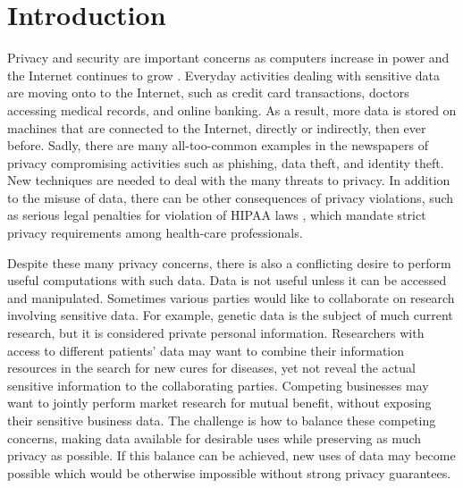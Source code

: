 
\chapter{Introduction}
\begin{quote}
%
\begin{comment}
\begin{quote}
As every man goes through life he fills in a number of forms for the
record, each containing a number of questions... There are thus hundreds
of little threads radiating from every man, millions of threads in
all. If these threads were suddenly to become visible, the whole sky
would look like a spider's web, and if they materialized as rubber
bands, buses; trams and even people would all lose the ability to
move, and the wind would be unable to carry torn-up newspapers or
autumn leaves along the streets of the city. They are not visible,
they are not material, but every man is constantly aware of their
existence.... Each man, permanently aware of his own invisible threads,
naturally develops a respect for the people who manipulate the threads.

--Alexander Solzhenitsyn, Cancer Ward, 1968.
\end{quote}

\end{comment}
{}
\end{quote}
Privacy and security are important concerns as computers increase
in power and the Internet continues to grow \cite{cra99,tur03}. Everyday
activities dealing with sensitive data are moving onto to the Internet,
such as credit card transactions, doctors accessing medical records,
and online banking. As a result, more data is stored on machines that
are connected to the Internet, directly or indirectly, then ever before.
Sadly, there are many all-too-common examples in the newspapers of
privacy compromising activities such as phishing, data theft, and
identity theft. New techniques are needed to deal with the many threats
to privacy. In addition to the misuse of data, there can be other
consequences of privacy violations, such as serious legal penalties
for violation of HIPAA laws \cite{hippa}, which mandate strict privacy
requirements among health-care professionals.

Despite these many privacy concerns, there is also a conflicting desire
to perform useful computations with such data. Data is not useful
unless it can be accessed and manipulated. Sometimes various parties
would like to collaborate on research involving sensitive data. For
example, genetic data is the subject of much current research, but
it is considered private personal information. Researchers with access
to different patients' data may want to combine their information
resources in the search for new cures for diseases, yet not reveal
the actual sensitive information to the collaborating parties. Competing
businesses may want to jointly perform market research for mutual
benefit, without exposing their sensitive business data. The challenge
is how to balance these competing concerns, making data available
for desirable uses while preserving as much privacy as possible. If
this balance can be achieved, new uses of data may become possible
which would be otherwise impossible without strong privacy guarantees.

